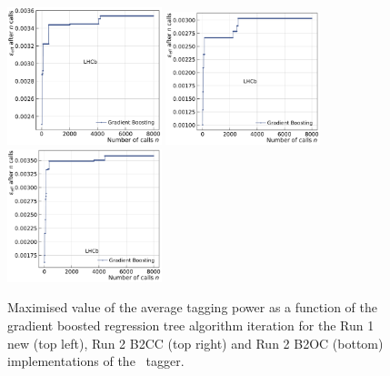 \begin{figure}[htbp]
	\begin{center}
        \includegraphics[width=0.4\textwidth]{04Flavourtagging/figs/OSelectronOpt/2017-12-12-vibattis-OSElectron-tagpartseloptimisation_Run1/ConvergenceOSe2017-nominal.pdf}
        \includegraphics[width=0.4\textwidth]{04Flavourtagging/figs/OSelectronOpt/2017-12-12-vibattis-OSElectron-tagpartseloptimisation_Run2/ConvergenceOSe2017-nominal.pdf} \\
        \includegraphics[width=0.4\textwidth]{04Flavourtagging/figs/OSelectronOpt/2018-04-06-vibattis-OSElectron-tagpartseloptimisation_Run2_Bu2D0pi/ConvergenceOSe2017-nominal.pdf} \\
       \end{center}
        \vspace{-2mm}
        \caption{Maximised value of the average tagging power as a function of the gradient boosted regression tree algorithm iteration for the Run 1 new (top left), Run 2 B2CC (top right) and Run 2 B2OC (bottom) implementations of the \OSe~tagger.}
        \label{fig:OSegbconvergence}
\end{figure}

